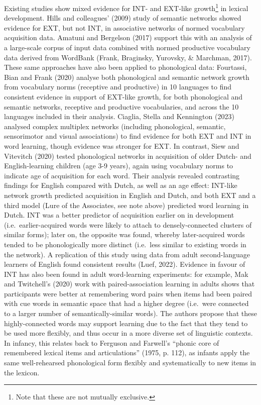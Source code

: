\documentclass[
  man]{apa6}
\begin{document}
Existing studies show mixed evidence for INT- and EXT-like growth\footnote{Note that these are not mutually exclusive.} in lexical development. Hills and colleagues' (2009) study of semantic networks showed evidence for EXT, but not INT, in associative networks of normed vocabulary acquisition data. Amatuni and Bergelson (2017) support this with an analysis of a large-scale corpus of input data combined with normed productive vocabulary data derived from WordBank (Frank, Braginsky, Yurovsky, \& Marchman, 2017). These same approaches have also been applied to phonological data: Fourtassi, Bian and Frank (2020) analyse both phonological and semantic network growth from vocabulary norms (receptive and productive) in 10 languages to find consistent evidence in support of EXT-like growth, for both phonological and semantic networks, receptive and productive vocabularies, and across the 10 languages included in their analysis. Ciaglia, Stella and Kennington (2023) analysed complex multiplex networks (including phonological, semantic, sensorimotor and visual associations) to find evidence for both EXT and INT in word learning, though evidence was stronger for EXT. In contrast, Siew and Vitevitch (2020) tested phonological networks in acquisition of older Dutch- and English-learning children (age 3-9 years), again using vocabulary norms to indicate age of acquisition for each word. Their analysis revealed contrasting findings for English compared with Dutch, as well as an age effect: INT-like network growth predicted acquisition in English and Dutch, and both EXT and a third model (Lure of the Associates, see note above) predicted word learning in Dutch. INT was a better predictor of acquisition earlier on in development (i.e.~earlier-acquired words were likely to attach to densely-connected clusters of similar forms); later on, the opposite was found, whereby later-acquired words tended to be phonologically more distinct (i.e.~less similar to existing words in the network). A replication of this study using data from adult second-language learners of English found consistent results (Luef, 2022). Evidence in favour of INT has also been found in adult word-learning experiments: for example, Mak and Twitchell's (2020) work with paired-association learning in adults shows that participants were better at remembering word pairs when items had been paired with cue words in semantic space that had a higher degree (i.e.~were connected to a larger number of semantically-similar words). The authors propose that these highly-connected words may support learning due to the fact that they tend to be used more flexibly, and thus occur in a more diverse set of linguistic contexts. In infancy, this relates back to Ferguson and Farwell's ``phonic core of remembered lexical items and articulations'' (1975, p. 112), as infants apply the same well-rehearsed phonological form flexibly and systematically to new items in the lexicon.
\end{document}
